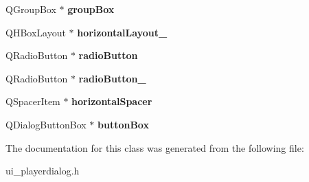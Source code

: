\begin{DoxyCompactItemize}
\item 
\hypertarget{classUi__PlayerDialog_abdb8e59012e0547e5ee4fcbd31c5d123}{Q\-Group\-Box $\ast$ {\bfseries group\-Box}}\label{classUi__PlayerDialog_abdb8e59012e0547e5ee4fcbd31c5d123}

\item 
\hypertarget{classUi__PlayerDialog_aab7e1fcb20ea71458e6eb77f177456f8}{Q\-H\-Box\-Layout $\ast$ {\bfseries horizontal\-Layout\-\_}}\label{classUi__PlayerDialog_aab7e1fcb20ea71458e6eb77f177456f8}

\item 
\hypertarget{classUi__PlayerDialog_a1371a8148278463d57100b9eb8ddb659}{Q\-Radio\-Button $\ast$ {\bfseries radio\-Button}}\label{classUi__PlayerDialog_a1371a8148278463d57100b9eb8ddb659}

\item 
\hypertarget{classUi__PlayerDialog_a4b9bdb7af51ebed981c239e7f4e30298}{Q\-Radio\-Button $\ast$ {\bfseries radio\-Button\-\_}}\label{classUi__PlayerDialog_a4b9bdb7af51ebed981c239e7f4e30298}

\item 
\hypertarget{classUi__PlayerDialog_a9d546737006452271099df6c12c26ea0}{Q\-Spacer\-Item $\ast$ {\bfseries horizontal\-Spacer}}\label{classUi__PlayerDialog_a9d546737006452271099df6c12c26ea0}

\item 
\hypertarget{classUi__PlayerDialog_ab775dc17461fb56eb9a722a1958ed4df}{Q\-Dialog\-Button\-Box $\ast$ {\bfseries button\-Box}}\label{classUi__PlayerDialog_ab775dc17461fb56eb9a722a1958ed4df}

\end{DoxyCompactItemize}


The documentation for this class was generated from the following file\-:\begin{DoxyCompactItemize}
\item 
ui\-\_\-playerdialog.\-h\end{DoxyCompactItemize}
